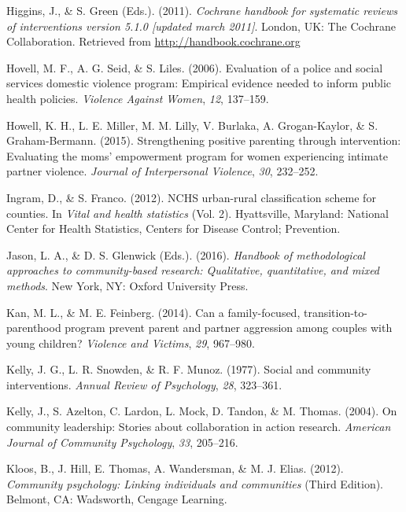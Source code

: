 \documentclass[11pt,]{tufte-book}
\begin{document}
\hypertarget{ref-higgins2011cochrane}{}
Higgins, J., \& S. Green (Eds.). (2011). \emph{Cochrane handbook for
systematic reviews of interventions version 5.1.0 {[}updated march
2011{]}}. London, UK: The Cochrane Collaboration. Retrieved from
\url{http://handbook.cochrane.org}

\hypertarget{ref-hovell2006evaluation}{}
Hovell, M. F., A. G. Seid, \& S. Liles. (2006). Evaluation of a police
and social services domestic violence program: Empirical evidence needed
to inform public health policies. \emph{Violence Against Women},
\emph{12}, 137--159.

\hypertarget{ref-howell2015strengthening}{}
Howell, K. H., L. E. Miller, M. M. Lilly, V. Burlaka, A. Grogan-Kaylor,
\& S. Graham-Bermann. (2015). Strengthening positive parenting through
intervention: Evaluating the moms' empowerment program for women
experiencing intimate partner violence. \emph{Journal of Interpersonal
Violence}, \emph{30}, 232--252.

\hypertarget{ref-ingram2012nchs}{}
Ingram, D., \& S. Franco. (2012). NCHS urban-rural classification scheme
for counties. In \emph{Vital and health statistics} (Vol. 2).
Hyattsville, Maryland: National Center for Health Statistics, Centers
for Disease Control; Prevention.

\hypertarget{ref-jason2016handbook}{}
Jason, L. A., \& D. S. Glenwick (Eds.). (2016). \emph{Handbook of
methodological approaches to community-based research: Qualitative,
quantitative, and mixed methods}. New York, NY: Oxford University Press.

\hypertarget{ref-kan2014can}{}
Kan, M. L., \& M. E. Feinberg. (2014). Can a family-focused,
transition-to-parenthood program prevent parent and partner aggression
among couples with young children? \emph{Violence and Victims},
\emph{29}, 967--980.

\hypertarget{ref-kelly1977social}{}
Kelly, J. G., L. R. Snowden, \& R. F. Munoz. (1977). Social and
community interventions. \emph{Annual Review of Psychology}, \emph{28},
323--361.

\hypertarget{ref-kelly2004community}{}
Kelly, J., S. Azelton, C. Lardon, L. Mock, D. Tandon, \& M. Thomas.
(2004). On community leadership: Stories about collaboration in action
research. \emph{American Journal of Community Psychology}, \emph{33},
205--216.

\hypertarget{ref-kloos2012community}{}
Kloos, B., J. Hill, E. Thomas, A. Wandersman, \& M. J. Elias. (2012).
\emph{Community psychology: Linking individuals and communities} (Third
Edition). Belmont, CA: Wadsworth, Cengage Learning.
\end{document}
